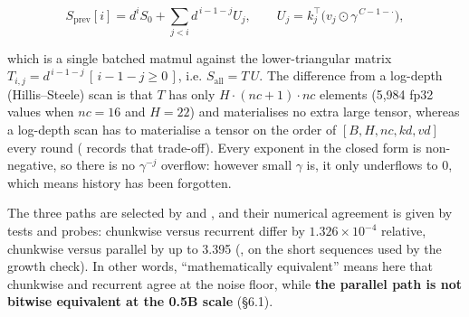 \documentclass[11pt,openany]{article}
\begin{document}
\[
S_{\text{prev}}[i]=d^{i}S_0+\sum_{j<i}d^{\,i-1-j}U_j,\qquad U_j=k_j^{\top}\big(v_j\odot\gamma^{\,C-1-\cdot}\big),
\]

which is a single batched matmul against the lower-triangular matrix
$T_{i,j}=d^{\,i-1-j}\,[\,i-1-j\ge0\,]$, i.e. $S_{\text{all}}=T\,U$. The difference from a
log-depth (Hillis--Steele) scan is that $T$ has only $H\cdot(nc+1)\cdot nc$ elements (5{,}984
fp32 values when $nc=16$ and $H=22$) and materialises no extra large tensor, whereas a log-depth
scan has to materialise a tensor on the order of $[B,H,nc,kd,vd]$ every round
(\linebreak[0]\linebreak[0] records that trade-off). Every exponent in the closed form is
non-negative, so there is no $\gamma^{-j}$ overflow: however small $\gamma$ is, it only
underflows to 0, which means history has been forgotten.

The three paths are selected by \linebreak[0]\linebreak[0] and , and their
numerical agreement is given by tests and probes: chunkwise versus recurrent differ by
$1.326\times10^{-4}$ relative, chunkwise versus parallel by up to 3.395
(\linebreak[0]\linebreak[0], on the short sequences used by the growth check). In other
words, ``mathematically equivalent'' means here that chunkwise and recurrent agree at the noise
floor, while \textbf{the parallel path is not bitwise equivalent at the 0.5B scale} (\S6.1).
\end{document}
